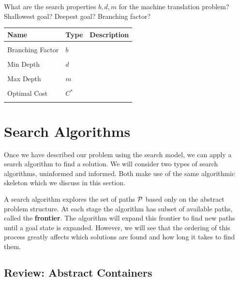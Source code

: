 \documentclass[11pt]{article}
\begin{document}
\begin{exercise}
  What are the search properties $b, d, m$ for the machine translation
  problem? Shallowest goal? Deepest goal? Branching factor?
\end{exercise}

\air
\begin{center}
\begin{tabularx}{\linewidth}{llX}
  \toprule
  Name  & Type & Description \\
  \midrule
\\
 Branching Factor & $b$ & \censor{}  \\\\
 Min Depth &  $d$ & \censor{} \\\\
 Max Depth & $m$& \censor{} \\\\
 Optimal Cost & $C^*$& \censor{} \\\\
 \bottomrule
\end{tabularx}
\end{center}


\section{Search Algorithms}


Once we have described our problem using the search model, we can
apply a search algorithm to find a solution. We will consider 
two types of search algorithms, uninformed and informed. Both 
make use of the same algorithmic skeleton which we discuss in this section.


A search algorithm explores the set of paths $\mathcal{P}$ based only on the
abstract problem structure. At each stage the algorithm has subset of
available paths, called the \textbf{frontier}. The algorithm will expand this
frontier to find new paths until a goal state is expanded. However, we
will see that the ordering of this process greatly affects which
solutions are found and how long it takes to find them.


\subsection{Review: Abstract Containers}
\end{document}
